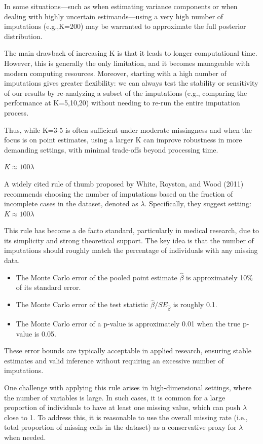 \documentclass{article}
\begin{document}
In some situations---such as when estimating variance components or when
dealing with highly uncertain estimands---using a very high number of
imputations (e.g.,K=200) may be warranted to approximate the full
posterior distribution.

The main drawback of increasing K is that it leads to longer
computational time. However, this is generally the only limitation, and
it becomes manageable with modern computing resources. Moreover,
starting with a high number of imputations gives greater flexibility: we
can always test the stability or sensitivity of our results by
re-analyzing a subset of the imputations (e.g., comparing the
performance at K=5,10,20) without needing to re-run the entire
imputation process.

Thus, while K=3-5 is often sufficient under moderate missingness and
when the focus is on point estimates, using a larger K can improve
robustness in more demanding settings, with minimal trade-offs beyond
processing time.

\(K \approx 100\lambda\)

A widely cited rule of thumb proposed by White, Royston, and Wood (2011)
recommends choosing the number of imputations based on the fraction of
incomplete cases in the dataset, denoted as \(\lambda\). Specifically,
they suggest setting:\(K \approx 100\lambda\)

This rule has become a de facto standard, particularly in medical
research, due to its simplicity and strong theoretical support. The key
idea is that the number of imputations should roughly match the
percentage of individuals with any missing data.

\begin{itemize}
\item
  The Monte Carlo error of the pooled point estimate \(\hat{\beta}\) is
  approximately 10\% of its standard error.
\item
  The Monte Carlo error of the test statistic
  \(\hat{\beta}/SE_{\hat{\beta}}\) is roughly 0.1.
\item
  The Monte Carlo error of a p-value is approximately 0.01 when the true
  p-value is 0.05.
\end{itemize}

These error bounds are typically acceptable in applied research,
ensuring stable estimates and valid inference without requiring an
excessive number of imputations.

One challenge with applying this rule arises in high-dimensional
settings, where the number of variables is large. In such cases, it is
common for a large proportion of individuals to have at least one
missing value, which can push \(\lambda\) close to 1. To address this,
it is reasonable to use the overall missing rate (i.e., total proportion
of missing cells in the dataset) as a conservative proxy for \(\lambda\)
when needed.
\end{document}
